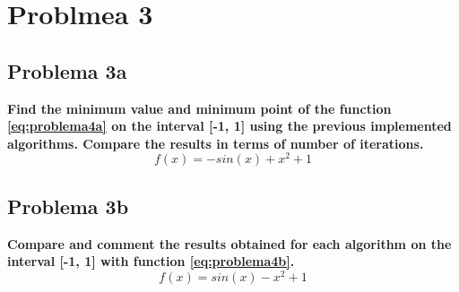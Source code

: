 \section*{Problmea 3}
\subsection*{Problema 3a}
\textbf{Find the minimum value and minimum point of the function \ref{eq:problema4a} on the interval [-1, 1] using the previous implemented algorithms. Compare the results in terms of number of iterations.}
\begin{equation}
    f(x) = -sin(x)+x^2+1
    \label{eq:problema4a}
\end{equation}

\subsection*{Problema 3b}
\textbf{Compare and comment the results obtained for each algorithm on the interval [-1, 1] with function \ref{eq:problema4b}.}
\begin{equation}
    f (x) = sin(x) - x^2 + 1
    \label{eq:problema4b}
\end{equation}
